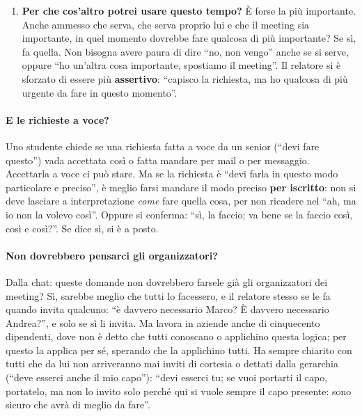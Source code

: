 \begin{enumerate}
        presentazioni in cui si leggono le slide; e infatti, osserva, in quel
        momento lui stesso stava leggendo una slide, ma aggiungendo informazioni.
        ``Se tutta la lezione fosse io che vi leggo le slide, non servirei io: vi
        manderei le slide.''
  \item \textbf{Per che cos'altro potrei usare questo tempo?} È forse la più
        importante. Anche ammesso che serva, che serva proprio lui e che il
        meeting sia importante, in quel momento dovrebbe fare qualcosa di più
        importante? Se sì, fa quella. Non bisogna avere paura di dire ``no, non
        vengo'' anche se si serve, oppure ``ho un'altra cosa importante,
        spostiamo il meeting''. Il relatore si è sforzato di essere più
        \textbf{assertivo}: ``capisco la richiesta, ma ho qualcosa di più urgente
        da fare in questo momento''.
\end{enumerate}

\paragraph{E le richieste a voce?} Uno studente chiede se una richiesta fatta a
voce da un senior (``devi fare questo'') vada accettata così o fatta mandare per
mail o per messaggio. Accettarla a voce ci può stare. Ma se la richiesta è ``devi
farla in questo modo particolare e preciso'', è meglio farsi mandare il modo
preciso \textbf{per iscritto}: non si deve lasciare a interpretazione \emph{come}
fare quella cosa, per non ricadere nel ``ah, ma io non la volevo così''. Oppure si
conferma: ``sì, la faccio; va bene se la faccio così, così e così?''. Se dice sì,
si è a posto.

\paragraph{Non dovrebbero pensarci gli organizzatori?} Dalla chat: queste domande
non dovrebbero farsele già gli organizzatori dei meeting? Sì, sarebbe meglio che
tutti lo facessero, e il relatore stesso se le fa quando invita qualcuno: ``è
davvero necessario Marco? È davvero necessario Andrea?'', e solo se sì li invita.
Ma lavora in aziende anche di cinquecento dipendenti, dove non è detto che tutti
conoscano o applichino questa logica; per questo la applica per sé, sperando che
la applichino tutti. Ha sempre chiarito con tutti che da lui non arriveranno mai
inviti di cortesia o dettati dalla gerarchia (``deve esserci anche il mio capo''):
``devi esserci tu; se vuoi portarti il capo, portatelo, ma non lo invito solo
perché qui si vuole sempre il capo presente: sono sicuro che avrà di meglio da
fare''.

